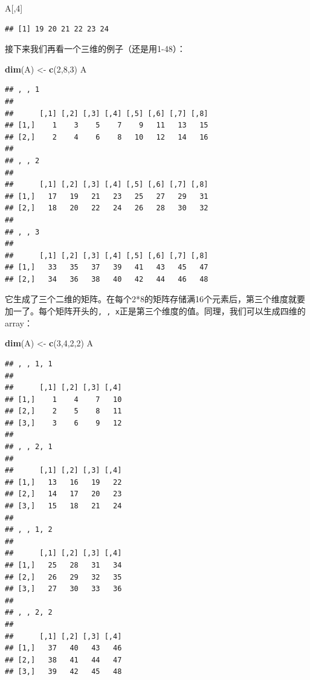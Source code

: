 \documentclass[]{book}
\newenvironment{Shaded}{\begin{snugshade}}{\end{snugshade}}
\newcommand{\DecValTok}[1]{\textcolor[rgb]{0.00,0.00,0.81}{#1}}
\newcommand{\KeywordTok}[1]{\textcolor[rgb]{0.13,0.29,0.53}{\textbf{#1}}}
\newcommand{\NormalTok}[1]{#1}
\newcommand{\StringTok}[1]{\textcolor[rgb]{0.31,0.60,0.02}{#1}}
\begin{document}
\begin{Shaded}
\begin{Highlighting}[]
\NormalTok{A[,}\DecValTok{4}\NormalTok{]}
\end{Highlighting}
\end{Shaded}

\begin{verbatim}
## [1] 19 20 21 22 23 24
\end{verbatim}

接下来我们再看一个三维的例子（还是用1-48）：

\begin{Shaded}
\begin{Highlighting}[]
\KeywordTok{dim}\NormalTok{(A) <-}\StringTok{ }\KeywordTok{c}\NormalTok{(}\DecValTok{2}\NormalTok{,}\DecValTok{8}\NormalTok{,}\DecValTok{3}\NormalTok{)}
\NormalTok{A}
\end{Highlighting}
\end{Shaded}

\begin{verbatim}
## , , 1
## 
##      [,1] [,2] [,3] [,4] [,5] [,6] [,7] [,8]
## [1,]    1    3    5    7    9   11   13   15
## [2,]    2    4    6    8   10   12   14   16
## 
## , , 2
## 
##      [,1] [,2] [,3] [,4] [,5] [,6] [,7] [,8]
## [1,]   17   19   21   23   25   27   29   31
## [2,]   18   20   22   24   26   28   30   32
## 
## , , 3
## 
##      [,1] [,2] [,3] [,4] [,5] [,6] [,7] [,8]
## [1,]   33   35   37   39   41   43   45   47
## [2,]   34   36   38   40   42   44   46   48
\end{verbatim}

它生成了三个二维的矩阵。在每个2*8的矩阵存储满16个元素后，第三个维度就要加一了。每个矩阵开头的\texttt{,\ ,\ x}正是第三个维度的值。同理，我们可以生成四维的array：

\begin{Shaded}
\begin{Highlighting}[]
\KeywordTok{dim}\NormalTok{(A) <-}\StringTok{ }\KeywordTok{c}\NormalTok{(}\DecValTok{3}\NormalTok{,}\DecValTok{4}\NormalTok{,}\DecValTok{2}\NormalTok{,}\DecValTok{2}\NormalTok{)}
\NormalTok{A}
\end{Highlighting}
\end{Shaded}

\begin{verbatim}
## , , 1, 1
## 
##      [,1] [,2] [,3] [,4]
## [1,]    1    4    7   10
## [2,]    2    5    8   11
## [3,]    3    6    9   12
## 
## , , 2, 1
## 
##      [,1] [,2] [,3] [,4]
## [1,]   13   16   19   22
## [2,]   14   17   20   23
## [3,]   15   18   21   24
## 
## , , 1, 2
## 
##      [,1] [,2] [,3] [,4]
## [1,]   25   28   31   34
## [2,]   26   29   32   35
## [3,]   27   30   33   36
## 
## , , 2, 2
## 
##      [,1] [,2] [,3] [,4]
## [1,]   37   40   43   46
## [2,]   38   41   44   47
## [3,]   39   42   45   48
\end{verbatim}
\end{document}
